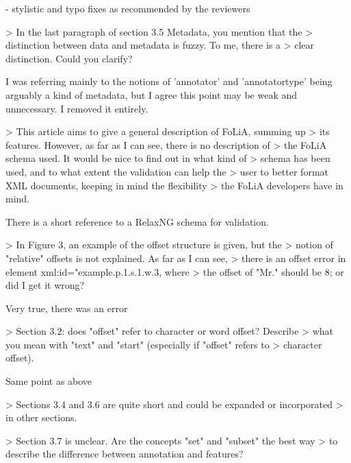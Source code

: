 - stylistic and typo fixes as recommended by the reviewers




> In the last paragraph of section 3.5 Metadata, you mention that the
> distinction between data and metadata is fuzzy. To me, there is a
> clear distinction. Could you clarify?

I was referring mainly to the notions of 'annotator' and 'annotatortype' being arguably a kind of metadata, but I agree this point may be weak and unnecessary. I removed it entirely.

> This article aims to give a general description of FoLiA, summing up
> its features. However, as far as I can see, there is no description of
> the FoLiA schema used. It would be nice to find out in what kind of
> schema has been used, and to what extent the validation can help the
> user to better format XML documents, keeping in mind the flexibility
> the FoLiA developers have in mind.

There is a short reference to a RelaxNG schema for validation. 

> In Figure 3, an example of the offset structure is given, but the
> notion of "relative" offsets is not explained. As far as I can see,
> there is an offset error in element xml:id="example.p.1.s.1.w.3, where
> the offset of "Mr." should be 8; or did I get it wrong?

Very true, there was an error



> Section 3.2: does "offset" refer to character or word offset? Describe
> what you mean with "text" and "start" (especially if "offset" refers to
> character offset).

Same point as above


> Sections 3.4 and 3.6 are quite short and could be expanded or incorporated
> in other sections.

> Section 3.7 is unclear. Are the concepts "set" and "subset" the best way
> to describe the difference between annotation and features?

